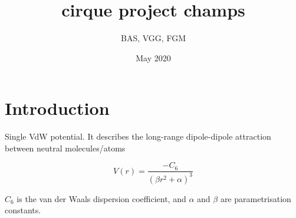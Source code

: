 \documentclass{article}
\title{cirque project champs}
\author{BAS, VGG, FGM}
\date{May 2020}
\begin{document}
\maketitle

\section{Introduction}


Single VdW potential. It describes the long-range dipole-dipole attraction between neutral molecules/atoms

\begin{equation}
    V(r) = \frac{- C_6}{(\beta r^2 + \alpha)^3}
\end{equation}

$C_6$ is the van der Waals dispersion coefficient, and $\alpha$ and $\beta$ are parametrisation constants.
\end{document}
